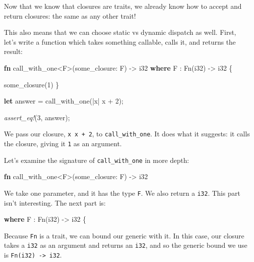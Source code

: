\documentclass[a4paper,]{book}
\newenvironment{Shaded}{\begin{snugshade}}{\end{snugshade}}
\newcommand{\KeywordTok}[1]{\textcolor[rgb]{0.13,0.29,0.53}{\textbf{{#1}}}}
\newcommand{\DataTypeTok}[1]{\textcolor[rgb]{0.13,0.29,0.53}{{#1}}}
\newcommand{\DecValTok}[1]{\textcolor[rgb]{0.00,0.00,0.81}{{#1}}}
\newcommand{\BuiltInTok}[1]{{#1}}
\newcommand{\PreprocessorTok}[1]{\textcolor[rgb]{0.56,0.35,0.01}{\textit{{#1}}}}
\newcommand{\NormalTok}[1]{{#1}}
\begin{document}
Now that we know that closures are traits, we already know how to accept
and return closures: the same as any other trait!

This also means that we can choose static vs dynamic dispatch as well.
First, let's write a function which takes something callable, calls it,
and returns the result:

\begin{Shaded}
\begin{Highlighting}[]
\KeywordTok{fn} \NormalTok{call_with_one<F>(some_closure: F) -> }\DataTypeTok{i32}
    \KeywordTok{where} \NormalTok{F : }\BuiltInTok{Fn}\NormalTok{(}\DataTypeTok{i32}\NormalTok{) -> }\DataTypeTok{i32} \NormalTok{\{}

    \NormalTok{some_closure(}\DecValTok{1}\NormalTok{)}
\NormalTok{\}}

\KeywordTok{let} \NormalTok{answer = call_with_one(|x| x + }\DecValTok{2}\NormalTok{);}

\PreprocessorTok{assert_eq!}\NormalTok{(}\DecValTok{3}\NormalTok{, answer);}
\end{Highlighting}
\end{Shaded}

We pass our closure, \texttt{\textbar{}x\textbar{}\ x\ +\ 2}, to
\texttt{call\_with\_one}. It does what it suggests: it calls the
closure, giving it \texttt{1} as an argument.

Let's examine the signature of \texttt{call\_with\_one} in more depth:

\begin{Shaded}
\begin{Highlighting}[]
\KeywordTok{fn} \NormalTok{call_with_one<F>(some_closure: F) -> }\DataTypeTok{i32}
\end{Highlighting}
\end{Shaded}

We take one parameter, and it has the type \texttt{F}. We also return a
\texttt{i32}. This part isn't interesting. The next part is:

\begin{Shaded}
\begin{Highlighting}[]
    \KeywordTok{where} \NormalTok{F : }\BuiltInTok{Fn}\NormalTok{(}\DataTypeTok{i32}\NormalTok{) -> }\DataTypeTok{i32} \NormalTok{\{}
\end{Highlighting}
\end{Shaded}

Because \texttt{Fn} is a trait, we can bound our generic with it. In
this case, our closure takes a \texttt{i32} as an argument and returns
an \texttt{i32}, and so the generic bound we use is
\texttt{Fn(i32)\ -\textgreater{}\ i32}.
\end{document}
